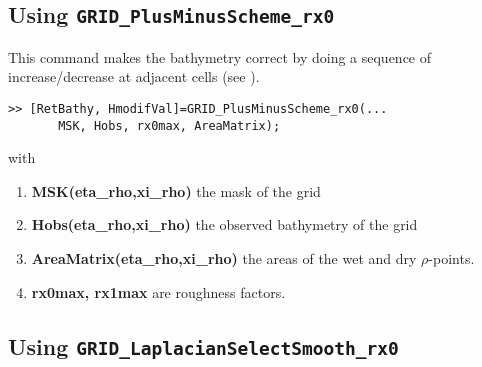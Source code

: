 \documentclass[12pt]{article}
\begin{document}






\subsection{Using {\tt GRID\_PlusMinusScheme\_rx0}}

This command makes the bathymetry correct by doing a sequence
of increase/decrease at adjacent cells (see \cite{conundrum}).
\begin{verbatim}
>> [RetBathy, HmodifVal]=GRID_PlusMinusScheme_rx0(...
       MSK, Hobs, rx0max, AreaMatrix);
\end{verbatim}
with
\begin{enumerate}
\item {\bf MSK(eta\_rho,xi\_rho)} the mask of the grid
\item {\bf Hobs(eta\_rho,xi\_rho)} the observed bathymetry of the grid
\item {\bf AreaMatrix(eta\_rho,xi\_rho)} the areas of the wet and dry $\rho$-points.
\item {\bf rx0max, rx1max} are roughness factors.
\end{enumerate}



\subsection{Using {\tt GRID\_LaplacianSelectSmooth\_rx0}}
\end{document}

